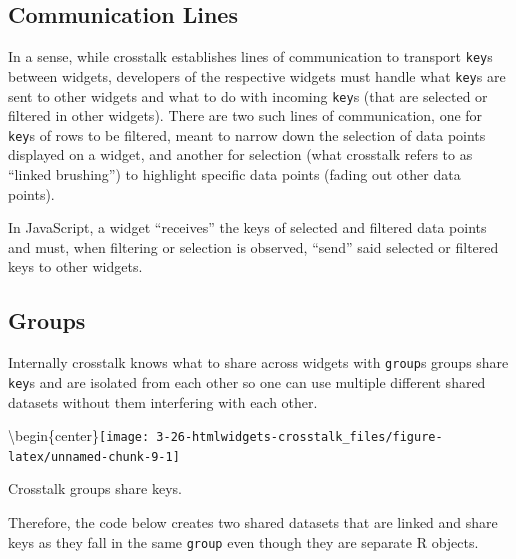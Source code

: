 \documentclass[
]{krantz}
\makeatletter
\newenvironment{Shaded}{\begin{snugshade}}{\end{snugshade}}
\newcommand{\DataTypeTok}[1]{\textcolor[rgb]{0.27,0.27,0.27}{#1}}
\newcommand{\KeywordTok}[1]{\textcolor[rgb]{0.27,0.27,0.27}{\textbf{#1}}}
\newcommand{\NormalTok}[1]{#1}
\newcommand{\OperatorTok}[1]{\textcolor[rgb]{0.43,0.43,0.43}{\textbf{#1}}}
\newcommand{\StringTok}[1]{\textcolor[rgb]{0.5,0.5,0.5}{#1}}
\newenvironment{kframe}{%
\medskip{}
\setlength{\fboxsep}{.8em}
 \def\at@end@of@kframe{}%
 \ifinner\ifhmode%
  \def\at@end@of@kframe{\end{minipage}}%
  \begin{minipage}{\columnwidth}%
 \fi\fi%
 \def\FrameCommand##1{\hskip\@totalleftmargin \hskip-\fboxsep
 \colorbox{shadecolor}{##1}\hskip-\fboxsep
     \hskip-\linewidth \hskip-\@totalleftmargin \hskip\columnwidth}%
 \MakeFramed {\advance\hsize-\width
   \@totalleftmargin\z@ \linewidth\hsize
   \@setminipage}}%
 {\par\unskip\endMakeFramed%
 \at@end@of@kframe}
\renewenvironment{Shaded}{\begin{kframe}}{\end{kframe}}
\newenvironment{rmdblock}[1]
  {
  \begin{itemize}
  \renewcommand{\labelitemi}{
    \raisebox{-.7\height}[0pt][0pt]{
      {\setkeys{Gin}{width=3em,keepaspectratio}\texttt{[image: images/\#1]}}
    }
  }
  \setlength{\fboxsep}{1em}
  \begin{kframe}
  \item
  }
  {
  \end{kframe}
  \end{itemize}
  }
\newenvironment{rmdnote}
  {\begin{rmdblock}{note}}
  {\end{rmdblock}}
\makeatother
\begin{document}
\hypertarget{linking-widgets-communication-lines}{%
\subsection{Communication Lines}\label{linking-widgets-communication-lines}}

In a sense, while crosstalk establishes lines of communication to transport \texttt{key}s between widgets, developers of the respective widgets must handle what \texttt{key}s are sent to other widgets and what to do with incoming \texttt{key}s (that are selected or filtered in other widgets). There are two such lines of communication, one for \texttt{key}s of rows to be filtered, meant to narrow down the selection of data points displayed on a widget, and another for selection (what crosstalk refers to as ``linked brushing'') to highlight specific data points (fading out other data points).

In JavaScript, a widget ``receives'' the keys of selected and filtered data points and must, when filtering or selection is observed, ``send'' said selected or filtered keys to other widgets.

\hypertarget{linking-widgets-groups}{%
\subsection{Groups}\label{linking-widgets-groups}}

Internally crosstalk knows what to share across widgets with \texttt{group}s groups share \texttt{key}s and are isolated from each other so one can use multiple different shared datasets without them interfering with each other.

\textbackslash begin\{center\}\texttt{[image: 3-26-htmlwidgets-crosstalk\_files/figure-latex/unnamed-chunk-9-1]}

\begin{rmdnote}
Crosstalk groups share keys.
\end{rmdnote}

Therefore, the code below creates two shared datasets that are linked and share keys as they fall in the same \texttt{group} even though they are separate R objects.

\begin{Shaded}
\end{Shaded}
\end{document}
